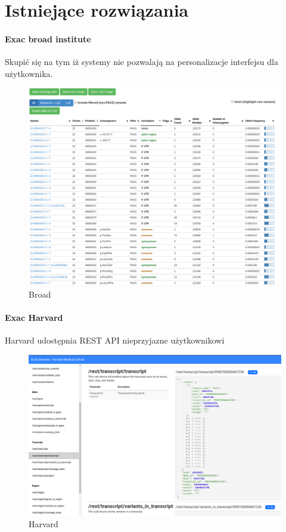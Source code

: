 \documentclass[a4paper,12pt,twoside]{article}
\begin{document}
\newpage
\section{Istniejące rozwiązania}  

\paragraph{Exac broad institute}
Skupić się na tym iż systemy nie pozwalają na personalizacje interfejsu dla użytkownika.
\begin{figure}[h]
\includegraphics[width=\linewidth]{obrazy/exac/broad.png}
  \caption{Broad}
  \label{fig:broadpic}
\end{figure}
\newpage
\paragraph{Exac Harvard}
Harvard udostępnia REST API nieprzyjazne użytkownikowi

\begin{figure}[h]
\includegraphics[width=\linewidth]{obrazy/exac/harvard1.png}
  \caption{Harvard}
  \label{fig:harvardpic}
\end{figure}
\newpage
\end{document}
